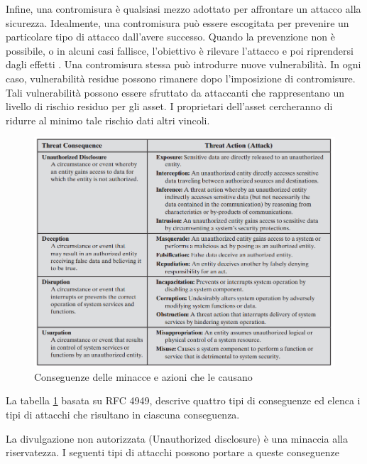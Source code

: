Infine, una contromisura è qualsiasi mezzo adottato per affrontare un attacco alla sicurezza. Idealmente, una contromisura può essere escogitata per prevenire un particolare tipo di attacco dall'avere successo. Quando la prevenzione non è possibile, o in alcuni casi fallisce, l'obiettivo è rilevare l'attacco e poi riprendersi dagli effetti . Una contromisura stessa può introdurre nuove vulnerabilità. In ogni caso, vulnerabilità residue
possono rimanere dopo l'imposizione di contromisure. Tali vulnerabilità possono essere sfruttato da attaccanti che rappresentano un livello di rischio residuo per gli asset. I proprietari dell'asset cercheranno di ridurre al minimo tale rischio dati altri vincoli.


\begin{figure}[H]
	\centering
    \includegraphics[width=14cm, keepaspectratio]{bistarelli/img/cap_1/tabella_minacce.png}
	\caption{Conseguenze delle minacce e azioni che le causano }\label{fig:tabella_minacce}
\end{figure}

La tabella \ref{fig:tabella_minacce} basata su RFC 4949, descrive quattro tipi di conseguenze ed elenca i tipi di attacchi che risultano in ciascuna conseguenza. 

La divulgazione non autorizzata (Unauthorized disclosure) è una minaccia alla riservatezza. I seguenti tipi di attacchi possono portare a queste conseguenze

